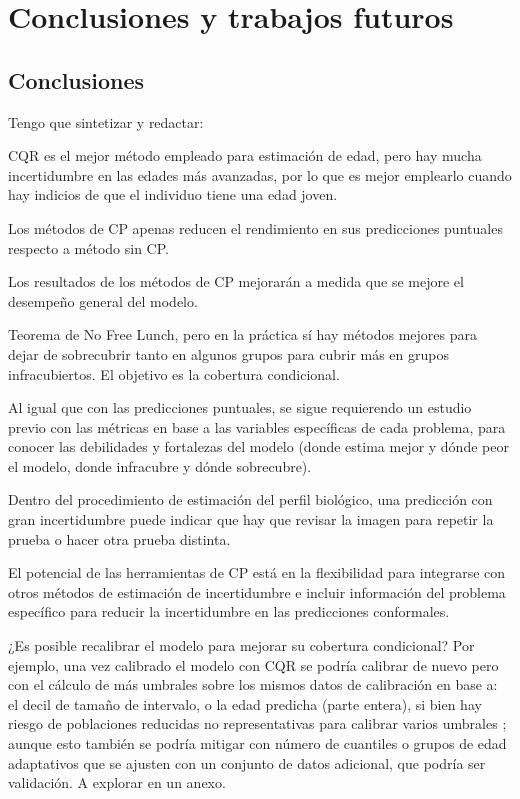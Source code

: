 \chapter{Conclusiones y trabajos futuros}

\section{Conclusiones}


Tengo que sintetizar y redactar:

CQR es el mejor método empleado para estimación de edad, pero hay mucha incertidumbre en las edades más avanzadas, por lo que es mejor emplearlo cuando hay indicios de que el individuo tiene una edad joven. 

Los métodos de CP apenas reducen el rendimiento en sus predicciones puntuales respecto a método sin CP.

Los resultados de los métodos de CP mejorarán a medida que se mejore el desempeño general del modelo.

Teorema de No Free Lunch, pero en la práctica sí hay métodos mejores para dejar de sobrecubrir tanto en algunos grupos para cubrir más en grupos infracubiertos. El objetivo es la cobertura condicional.

Al igual que con las predicciones puntuales, se sigue requierendo un estudio previo con las métricas en base a las variables específicas de cada problema, para conocer las debilidades y fortalezas del modelo (donde estima mejor y dónde peor el modelo, donde infracubre y dónde sobrecubre). 

Dentro del procedimiento de estimación del perfil biológico, una predicción con gran incertidumbre puede indicar que hay que revisar la imagen para repetir la prueba o hacer otra prueba distinta. 

El potencial de las herramientas de CP está en la flexibilidad para integrarse con otros métodos de estimación de incertidumbre e incluir información del problema específico para reducir la incertidumbre en las predicciones conformales.

¿Es posible recalibrar el modelo para mejorar su cobertura condicional? Por ejemplo, una vez calibrado el modelo con CQR se podría calibrar de nuevo pero con el cálculo de más umbrales sobre los mismos datos de calibración en base a: el decil de tamaño de intervalo, o la edad predicha (parte entera), si bien hay riesgo de poblaciones reducidas no representativas para calibrar varios umbrales ; aunque esto también se podría mitigar con número de cuantiles o grupos de edad adaptativos que se ajusten con un conjunto de datos adicional, que podría ser validación. A explorar en un anexo. 


